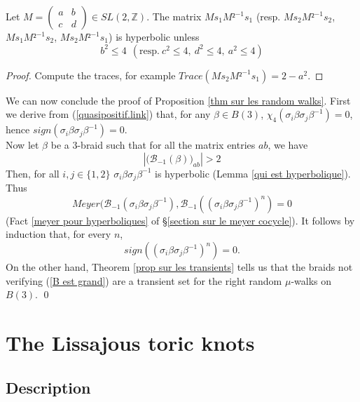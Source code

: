\documentclass[12pt]{article}
\begin{document}
	\begin{lem}\label{qui est hyperbolique}
		Let $M=\begin{pmatrix}
		a & b \\
		c & d 
		\end{pmatrix}\in SL(2,\mathbb{Z})$. The matrix $Ms_1M²^{-1}s_1$ (resp. $Ms_2M²^{-1}s_2$, $Ms_1M²^{-1}s_2$, $Ms_2M²^{-1}s_1$)  is hyperbolic unless 
		\begin{equation}\label{condition pour l'hyperbolicite}
		b^2\leq 4\ \ (\mbox{resp}.\ c^2\leq 4,\  d^2\leq 4,\  a^2\leq 4)
		\end{equation} 
	\end{lem}
\begin{proof} Compute the traces, for example 
$Trace(Ms_2M²^{-1}s_1)=2-a^2$. \end{proof}
We can now conclude the proof of Proposition \ref{thm sur les random walks}. First we derive from (\ref{quasipositif.link}) that, for any $\beta\in B(3)$, $\chi_4(\sigma_i\beta\sigma_{j}\beta^{-1})=0$, hence $sign(\sigma_i\beta\sigma_{j}\beta^{-1})=0$. \\ Now let $\beta$ be a $3$-braid such that for all the matrix entries $ab$, we have
\begin{equation}\label{B est grand}
|\big({\mathcal B}_{-1}(\beta)\big)_{ab}|>2
\end{equation}
Then, for all $i,j\in\{1,2\}$ $\sigma_i\beta\sigma_{j}\beta^{-1}$ is hyperbolic (Lemma \ref{qui est hyperbolique}). Thus
 $$Meyer({\mathcal B}_{-1}(\sigma_i\beta\sigma_{j}\beta^{-1}),{\mathcal B}_{-1}((\sigma_i\beta\sigma_{j}\beta^{-1})^n)=0$$ (Fact \ref{meyer pour hyperboliques} of \S \ref{section sur le meyer cocycle}). It follows by induction that, for every $n$, $$sign((\sigma_i\beta\sigma_{j}\beta^{-1})^n)=0.$$
 On the other hand, Theorem \ref{prop sur les transients} tells us that the braids not verifying (\ref{B est grand}) are a transient set for the right random $\mu$-walks on $B(3)$. 
	 \qed
	
	



\section{The Lissajous toric knots}\label{rappels sur les lissajous toriques}
\subsection{Description} 
\end{document}
